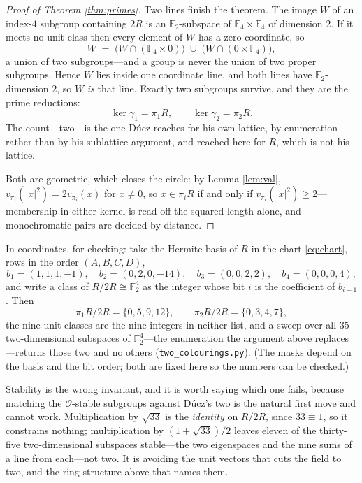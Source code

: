 \documentclass[11pt,reqno]{amsart}
\theoremstyle{plain}
\theoremstyle{definition}
\newcommand{\F}{\mathbb{F}}
\newcommand{\Lat}{R}
\newcommand{\Ok}{\mathcal{O}}
\begin{document}
\begin{proof}[Proof of Theorem \ref{thm:primes}]
Two lines finish the theorem. The image $W$ of an index-$4$ subgroup containing
$2\Lat$ is an $\F_2$-subspace of $\F_4 \times \F_4$ of dimension $2$. If it meets
no unit class then every element of $W$ has a zero coordinate, so
\[
  W \;=\; \big(W \cap (\F_4 \times 0)\big) \;\cup\; \big(W \cap (0 \times \F_4)\big) ,
\]
a union of two subgroups---and a group is never the union of two proper subgroups.
Hence $W$ lies inside one coordinate line, and both lines have $\F_2$-dimension
$2$, so $W$ \emph{is} that line. Exactly two subgroups survive, and they are the
prime reductions:
\[
  \ker\gamma_1 = \pi_1\Lat, \qquad \ker\gamma_2 = \pi_2\Lat .
\]
The count---two---is the one D\'ucz reaches for his own lattice, by enumeration
rather than by his sublattice argument, and reached here for $\Lat$, which is not
his lattice.

Both are geometric, which closes the circle: by Lemma \ref{lem:val},
$v_{\pi_i}(\lvert x\rvert^2) = 2v_{\pi_i}(x)$ for $x \ne 0$, so $x \in \pi_i\Lat$
if and only if $v_{\pi_i}(\lvert x \rvert^2) \ge 2$---membership in either kernel
is read off the squared length alone, and monochromatic pairs are decided by
distance.
\end{proof}

In coordinates, for checking: take the Hermite basis of $\Lat$ in the chart
\eqref{eq:chart}, rows in the order $(A,B,C,D)$,
\[
  b_1 = (1,1,1,-1), \quad b_2 = (0,2,0,-14), \quad
  b_3 = (0,0,2,2), \quad b_4 = (0,0,0,4),
\]
and write a class of $\Lat/2\Lat \cong \F_2^4$ as the integer whose bit $i$ is the
coefficient of $b_{i+1}$. Then
\[
  \pi_1\Lat/2\Lat = \{0,5,9,12\}, \qquad \pi_2\Lat/2\Lat = \{0,3,4,7\},
\]
the nine unit classes are the nine integers in neither list, and a sweep over all
$35$ two-dimensional subspaces of $\F_2^4$---the enumeration the argument above
replaces---returns those two and no others (\texttt{two\_colourings.py}). (The
masks depend on the basis and the bit order; both are fixed here so the numbers
can be checked.)

Stability is the wrong invariant, and it is worth saying which one fails, because
matching the $\Ok$-stable subgroups against D\'ucz's two is the natural first move
and cannot work. Multiplication by $\sqrt{33}$ is the \emph{identity} on
$\Lat/2\Lat$, since $33 \equiv 1$, so it constrains nothing; multiplication by
$(1+\sqrt{33})/2$ leaves eleven of the thirty-five two-dimensional subspaces
stable---the two eigenspaces and the nine sums of a line from each---not two. It
is avoiding the unit vectors that cuts the field to two, and the ring structure
above that names them.
\end{document}
